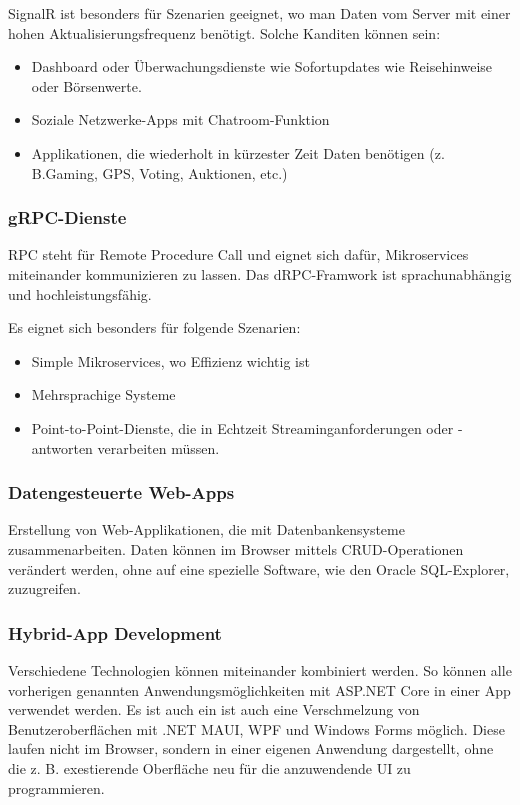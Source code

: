SignalR ist besonders für Szenarien geeignet, wo man Daten vom Server mit einer hohen Aktualisierungsfrequenz benötigt. 
Solche Kanditen können sein:
\begin{itemize}
    \item Dashboard oder Überwachungsdienste wie Sofortupdates wie Reisehinweise oder Börsenwerte.
    \item Soziale Netzwerke-Apps mit Chatroom-Funktion
    \item Applikationen, die wiederholt in kürzester Zeit Daten benötigen (z. B.Gaming, GPS, Voting, Auktionen, etc.)
\end{itemize}

\subsubsection{gRPC-Dienste}
RPC steht für Remote Procedure Call und eignet sich dafür, Mikroservices miteinander kommunizieren zu lassen.
Das dRPC-Framwork ist sprachunabhängig und hochleistungsfähig.

Es eignet sich besonders für folgende Szenarien:
\begin{itemize}
    \item Simple Mikroservices, wo Effizienz wichtig ist
    \item Mehrsprachige Systeme
    \item Point-to-Point-Dienste, die in Echtzeit Streaminganforderungen oder -antworten verarbeiten müssen.
\end{itemize}

\subsubsection{Datengesteuerte Web-Apps}
Erstellung von Web-Applikationen, die mit Datenbankensysteme zusammenarbeiten. Daten können im 
Browser mittels CRUD-Operationen verändert werden, ohne auf eine spezielle Software, wie den Oracle SQL-Explorer, zuzugreifen.

\subsubsection{Hybrid-App Development}
Verschiedene Technologien können miteinander kombiniert werden. So können alle vorherigen genannten Anwendungsmöglichkeiten 
mit ASP.NET Core in einer App verwendet werden. 
Es ist auch ein ist auch eine Verschmelzung von Benutzeroberflächen mit .NET MAUI, WPF und Windows Forms möglich. Diese laufen nicht im Browser, 
sondern in einer eigenen Anwendung dargestellt, ohne die z. B. exestierende Oberfläche neu für die anzuwendende UI zu programmieren.

